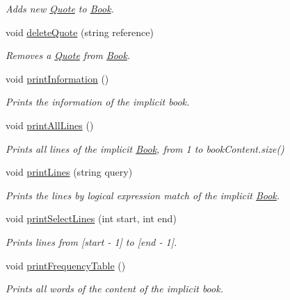 \begin{DoxyCompactItemize}
\begin{DoxyCompactList}\small\item\em Adds new \hyperlink{class_quote}{Quote} to \hyperlink{class_book}{Book}. \end{DoxyCompactList}\item 
void \hyperlink{class_book_a0829e0eaf0769c2bdbd149d2cf2ce20b}{delete\-Quote} (string reference)
\begin{DoxyCompactList}\small\item\em Removes a \hyperlink{class_quote}{Quote} from \hyperlink{class_book}{Book}. \end{DoxyCompactList}\item 
void \hyperlink{class_book_a5b67f59017da9d2654c27fa27927a419}{print\-Information} ()
\begin{DoxyCompactList}\small\item\em Prints the information of the implicit book. \end{DoxyCompactList}\item 
void \hyperlink{class_book_a07076ae8fe5e924f18bf7527e0ba5092}{print\-All\-Lines} ()
\begin{DoxyCompactList}\small\item\em Prints all lines of the implicit \hyperlink{class_book}{Book}, from 1 to book\-Content.\-size() \end{DoxyCompactList}\item 
void \hyperlink{class_book_a0c019a8318999229bf506f7f64e67a85}{print\-Lines} (string query)
\begin{DoxyCompactList}\small\item\em Prints the lines by logical expression match of the implicit \hyperlink{class_book}{Book}. \end{DoxyCompactList}\item 
void \hyperlink{class_book_a7193030998d6251851be26196762f8e6}{print\-Select\-Lines} (int start, int end)
\begin{DoxyCompactList}\small\item\em Prints lines from \mbox{[}start -\/ 1\mbox{]} to \mbox{[}end -\/ 1\mbox{]}. \end{DoxyCompactList}\item 
void \hyperlink{class_book_ac8b57c6a725ae9afeb24e6e74d4f8fd0}{print\-Frequency\-Table} ()
\begin{DoxyCompactList}\small\item\em Prints all words of the content of the implicit book. \end{DoxyCompactList}\end{DoxyCompactItemize}

